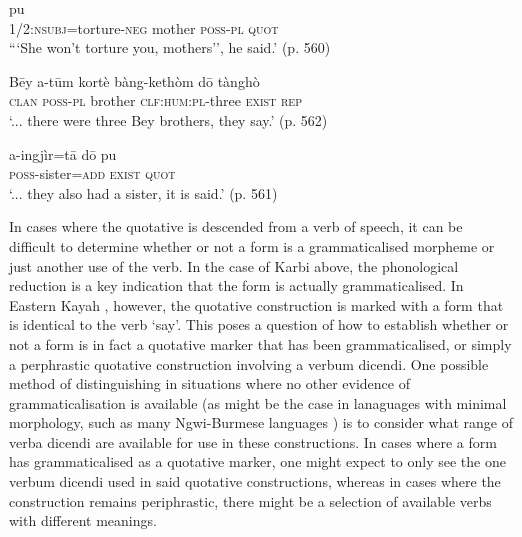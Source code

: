 \begin{exe}
        \ex 
        \begin{xlist}
                \ex\label{e:Description:KarbiQuot}
                \gll [nang=chenék-Cē pēi a-tūm] pu \\
                1/2:\textsc{nsubj}=torture-\textsc{neg} mother \textsc{poss-pl} \textsc{quot} \\
                \glt ```She won't torture you, mothers'', he said.' (p. 560)

                \ex\label{e:Description:KarbiReport}
                \gll Bēy a-tūm kortè bàng-kethòm dō tànghò \\
                \textsc{clan} \textsc{poss-pl} brother \textsc{clf:hum:pl}-three \textsc{exist} \textsc{rep} \\
                \glt `... there were three Bey brothers, they say.' (p. 562)

                \ex\label{e:Description:KarbiBoth}
                \gll a-ingjìr=tā dō pu \\
                \textsc{poss}-sister=\textsc{add} \textsc{exist} \textsc{quot} \\
                \glt `... they also had a sister, it is said.' (p. 561)
        \end{xlist}
        \cite[Karbi,][]{Konnerth2020}
\end{exe}

In cases where the quotative is descended from a verb of speech, it can be difficult to determine whether or not a form is a grammaticalised morpheme or just another use of the verb. In the case of Karbi above, the phonological reduction is a key indication that the form is actually grammaticalised. In Eastern Kayah \cite[Karenic: Myanmar,][]{Solnit1986}, however, the quotative construction is marked with a form that is identical to the verb `say'. This poses a question of how to establish whether or not a form is in fact a quotative marker that has been grammaticalised, or simply a perphrastic quotative construction involving a verbum dicendi. One possible method of distinguishing in situations where no other evidence of grammaticalisation is available (as might be the case in lanaguages with minimal morphology, such as many Ngwi-Burmese languages ) is to consider what range of verba dicendi are available for use in these constructions. In cases where a form has grammaticalised as a quotative marker, one might expect to only see the one verbum dicendi used in said quotative constructions, whereas in cases where the construction remains periphrastic, there might be a selection of available verbs with different meanings.

